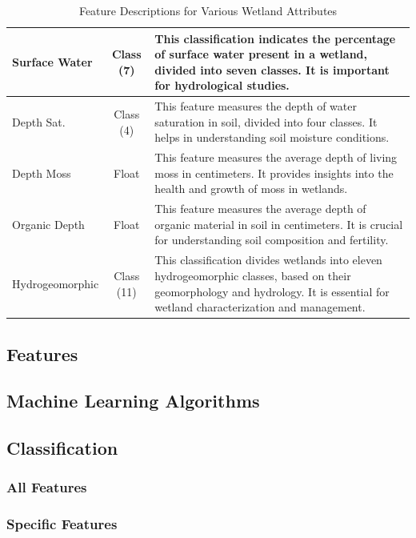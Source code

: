 \documentclass[12pt,letterpaper]{article}
\begin{document}
\begin{table}[h]
\begin{tabular}{|m{3cm}|c|m{11cm}|}
        \hline
        Surface Water & Class (7) & This classification indicates the percentage of surface water present in a wetland, divided into seven classes. It is important for hydrological studies. \\
        \hline
        Depth Sat. & Class (4) & This feature measures the depth of water saturation in soil, divided into four classes. It helps in understanding soil moisture conditions. \\
        \hline
        Depth Moss & Float & This feature measures the average depth of living moss in centimeters. It provides insights into the health and growth of moss in wetlands. \\
        \hline
        Organic Depth & Float & This feature measures the average depth of organic material in soil in centimeters. It is crucial for understanding soil composition and fertility. \\
        \hline
        Hydrogeomorphic & Class (11) & This classification divides wetlands into eleven hydrogeomorphic classes, based on their geomorphology and hydrology. It is essential for wetland characterization and management. \\
        \hline
    \end{tabular}
    \caption{Feature Descriptions for Various Wetland Attributes}
    \label{tab:data_xtra_features}
\end{table}
\clearpage
\subsection{Features}


\clearpage
\subsection{Machine Learning Algorithms}\label{sec:algorithms}


\subsection{Classification}\label{sec:class_annex}
\subsubsection{All Features}
%

\subsubsection{Specific Features}
%
\end{document}
